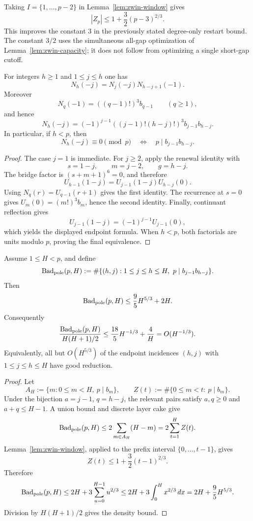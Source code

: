 \begin{remark}\label{lem:zwin-global}
Taking $I=\{1,\ldots,p-2\}$ in Lemma~\ref{lem:zwin-window} gives
\[
 |Z_p|\leq1+\frac32(p-3)^{2/3}.
\]
This improves the constant $3$ in the previously stated degree-only restart
bound.  The constant $3/2$ uses the simultaneous all-gap optimization of
Lemma~\ref{lem:zwin-capacity}; it does not follow from optimizing a single
short-gap cutoff.
\end{remark}

\begin{lemma}\label{lem:zwin-endpoint}
For integers $h\geq1$ and $1\leq j\leq h$ one has
\[
 N_h(-j)=N_j(-j)N_{h-j+1}(-1).
\]
Moreover
\[
 N_q(-1)=((q-1)!)^3b_{q-1}
 \qquad(q\geq1),
\]
and hence
\[
 N_h(-j)
 =(-1)^{j-1}((j-1)!(h-j)!)^3b_{j-1}b_{h-j}.
\]
In particular, if $h<p$, then
\[
 N_h(-j)\equiv0\pmod p
 \quad\Longleftrightarrow\quad
 p\mid b_{j-1}b_{h-j}.
\]
\end{lemma}

\begin{proof}
The case $j=1$ is immediate.  For $j\geq2$, apply the renewal identity with
\[
 s=1-j,
 \qquad
 m=j-2,
 \qquad
 g=h-j.
\]
The bridge factor is $(s+m+1)^6=0$, and therefore
\[
 U_{h-1}(1-j)=U_{j-1}(1-j)U_{h-j}(0).
\]
Using $N_q(r)=U_{q-1}(r+1)$ gives the first identity.  The recurrence at
$s=0$ gives $U_m(0)=(m!)^3b_m$, hence the second identity.  Finally,
continuant reflection gives
\[
 U_{j-1}(1-j)=(-1)^{j-1}U_{j-1}(0),
\]
which yields the displayed endpoint formula.  When $h<p$, both factorials
are units modulo $p$, proving the final equivalence.
\end{proof}

\begin{lemma}\label{lem:zwin-good-reduction}
Assume $1\leq H<p$, and define
\[
 \operatorname{Bad}_{\rm pole}(p,H)
 :=\#\{(h,j):1\leq j\leq h\leq H,
        \ p\mid b_{j-1}b_{h-j}\}.
\]
Then
\[
 \operatorname{Bad}_{\rm pole}(p,H)
 \leq \frac95H^{5/3}+2H.
\]
Consequently
\[
 \frac{\operatorname{Bad}_{\rm pole}(p,H)}{H(H+1)/2}
 \leq \frac{18}{5}H^{-1/3}+\frac4H
 =O(H^{-1/3}).
\]
Equivalently, all but $O(H^{5/3})$ of the endpoint incidences
$(h,j)$ with $1\leq j\leq h\leq H$ have good reduction.
\end{lemma}

\begin{proof}
Let
\[
 A_H:=\{m:0\leq m<H,\ p\mid b_m\},
 \qquad
 Z(t):=\#\{0\leq m<t:\ p\mid b_m\}.
\]
Under the bijection $a=j-1$, $q=h-j$, the relevant pairs satisfy
$a,q\geq0$ and $a+q\leq H-1$.  A union bound and discrete layer cake give
\[
 \operatorname{Bad}_{\rm pole}(p,H)
 \leq2\sum_{m\in A_H}(H-m)
 =2\sum_{t=1}^H Z(t).
\]
Lemma~\ref{lem:zwin-window}, applied to the prefix interval
$\{0,\ldots,t-1\}$, gives
\[
 Z(t)\leq1+\frac32(t-1)^{2/3}.
\]
Therefore
\[
 \operatorname{Bad}_{\rm pole}(p,H)
 \leq2H+3\sum_{u=0}^{H-1}u^{2/3}
 \leq2H+3\int_0^H x^{2/3}\,dx
 =2H+\frac95H^{5/3}.
\]
Division by $H(H+1)/2$ gives the density bound.
\end{proof}

